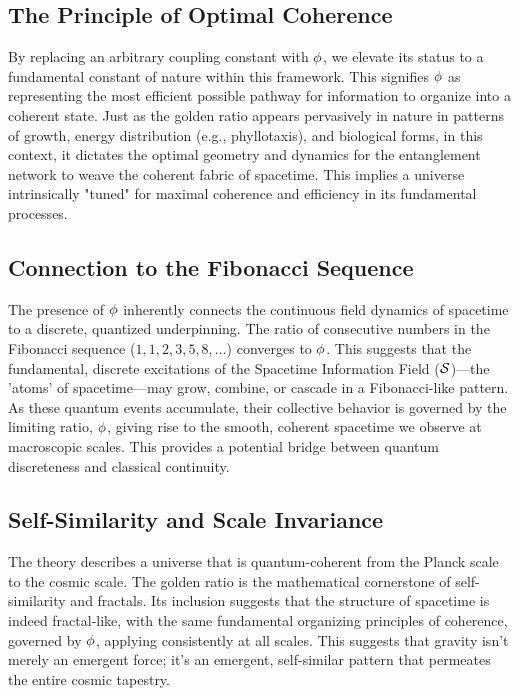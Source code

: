 \subsection*{The Principle of Optimal Coherence}
By replacing an arbitrary coupling constant with $\phi$, we elevate its status to a fundamental constant of nature within this framework. This signifies $\phi$ as representing the most efficient possible pathway for information to organize into a coherent state. Just as the golden ratio appears pervasively in nature in patterns of growth, energy distribution (e.g., phyllotaxis), and biological forms, in this context, it dictates the optimal geometry and dynamics for the entanglement network to weave the coherent fabric of spacetime. This implies a universe intrinsically "tuned" for maximal coherence and efficiency in its fundamental processes.

\subsection*{Connection to the Fibonacci Sequence}
The presence of $\phi$ inherently connects the continuous field dynamics of spacetime to a discrete, quantized underpinning. The ratio of consecutive numbers in the Fibonacci sequence ($1, 1, 2, 3, 5, 8, \dots$) converges to $\phi$. This suggests that the fundamental, discrete excitations of the Spacetime Information Field ($\mathcal{S}$)—the 'atoms' of spacetime—may grow, combine, or cascade in a Fibonacci-like pattern. As these quantum events accumulate, their collective behavior is governed by the limiting ratio, $\phi$, giving rise to the smooth, coherent spacetime we observe at macroscopic scales. This provides a potential bridge between quantum discreteness and classical continuity.

\subsection*{Self-Similarity and Scale Invariance}
The theory describes a universe that is quantum-coherent from the Planck scale to the cosmic scale. The golden ratio is the mathematical cornerstone of self-similarity and fractals. Its inclusion suggests that the structure of spacetime is indeed fractal-like, with the same fundamental organizing principles of coherence, governed by $\phi$, applying consistently at all scales. This suggests that gravity isn't merely an emergent force; it's an emergent, self-similar pattern that permeates the entire cosmic tapestry.

